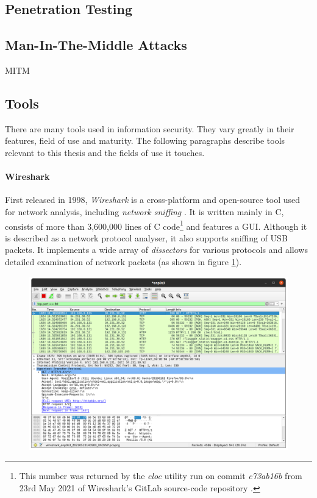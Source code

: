 \subsection{Penetration Testing}

\subsection{Man-In-The-Middle Attacks}
\ac{MITM}

\subsection{Tools}
There are many tools used in information security. They vary greatly in their features, field of use and maturity. The following paragraphs describe tools relevant to this thesis and the fields of use it touches.

\paragraph{Wireshark} First released in 1998, \emph{Wireshark} is a cross-platform and open-source tool used for network analysis, including \emph{network sniffing} \cite{wireshark}. It is written mainly in C, consists of more than 3,600,000 lines of C code\footnote{This number was returned by the \emph{cloc} utility run on commit \emph{c73ab16b} from 23rd May 2021 of Wireshark's GitLab source-code repository \cite{wiresharkgit}.} and features a \ac{GUI}. Although it is described as a network protocol analyser, it also supports sniffing of \ac{USB} packets. It implements a wide array of \emph{dissectors} for various protocols and allows detailed examination of network packets (as shown in figure \ref{fig:wireshark}).

\begin{figure}[h]
    \centering
    \includegraphics[width=14cm]{img/ch03/wireshark.png}
    \label{fig:wireshark}
\end{figure}

